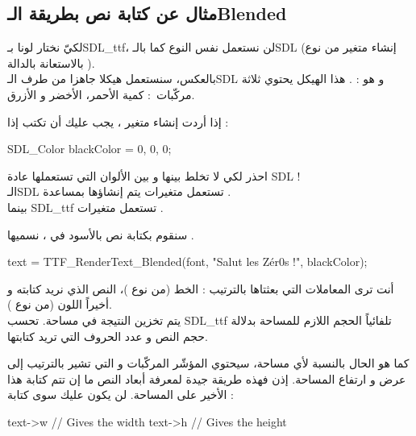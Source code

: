 \subsection{مثال عن كتابة نص بطريقة الـ\textenglish{Blended}}

لكيّ نختار لونا بـ\textenglish{SDL\_ttf}،
لن نستعمل نفس النوع كما بالـ\textenglish{SDL}
(إنشاء متغير من نوع
بالاستعانة بالدالة
).\\
بالعكس، سنستعمل هيكلا جاهزا من طرف الـ\textenglish{SDL}
و هو : 
.
هذا الهيكل يحتوي ثلاثة مركّبات~: كمية الأحمر، الأخضر و الأزرق.

إذا أردت إنشاء متغير
،
يجب عليك أن تكتب إذا :

\begin{Csource}
SDL_Color blackColor = {0, 0, 0};
\end{Csource}

\begin{warning}
احذر لكي لا تخلط بينها و بين الألوان التي تستعملها عادة 
\textenglish{SDL} !\\
الـ\textenglish{SDL}
تستعمل متغيرات
يتم إنشاؤها بمساعدة 
.\\
بينما
\textenglish{SDL\_ttf}
تستعمل متغيرات
.
\end{warning}

سنقوم بكتابة نص بالأسود في
،
نسميها
.

\begin{Csource}
text = TTF_RenderText_Blended(font, "Salut les Zér0s !", blackColor);
\end{Csource}

أنت ترى  المعاملات التي بعثتاها بالترتيب : الخط (من نوع
)،
النص الذي نريد كتابته و أخيراً اللون (من نوع
).\\
يتم تخزين النتيجة في مساحة. تحسب
\textenglish{SDL\_ttf}
تلفائياً الحجم اللازم للمساحة بدلالة حجم النص و عدد الحروف التي تريد كتابتها.

كما هو الحال بالنسبة لأي مساحة، سيحتوي المؤشّر
المركّبات
و
التي تشير بالترتيب إلى عرض و ارتفاع المساحة. إذن فهذه طريقة جيدة لمعرفة أبعاد النص ما إن تتم كتابة هذا الأخير على المساحة. لن يكون عليك سوى كتابة :

\begin{Csource}
text->w // Gives the width
text->h // Gives the height
\end{Csource}

